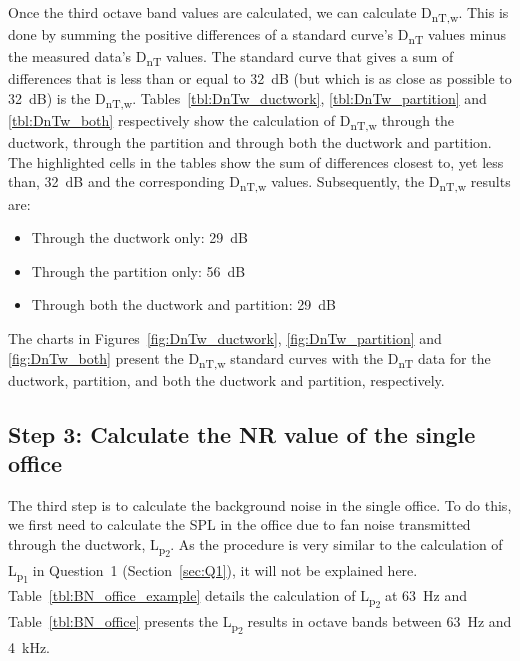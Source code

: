 Once the third octave band values are calculated, we can calculate D\textsubscript{nT,w}.
This is done by summing the positive differences of a standard curve's D\textsubscript{nT} values minus the measured data's D\textsubscript{nT} values.
The standard curve that gives a sum of differences that is less than or equal to 32~dB (but which is as close as possible to 32~dB) is the D\textsubscript{nT,w}.
Tables~\ref{tbl:DnTw_ductwork}, \ref{tbl:DnTw_partition} and \ref{tbl:DnTw_both} respectively show the calculation of D\textsubscript{nT,w} through the ductwork, through the partition and through both the ductwork and partition.
The highlighted cells in the tables show the sum of differences closest to, yet less than, 32~dB and the corresponding D\textsubscript{nT,w} values.
Subsequently, the D\textsubscript{nT,w} results are:
\begin{itemize}
	\item Through the ductwork only: 29~dB
	\item Through the partition only: 56~dB
	\item Through both the ductwork and partition: 29~dB
\end{itemize}

The charts in Figures~\ref{fig:DnTw_ductwork}, \ref{fig:DnTw_partition} and \ref{fig:DnTw_both} present the D\textsubscript{nT,w} standard curves with the D\textsubscript{nT} data for the ductwork, partition, and both the ductwork and partition, respectively.


	














\subsection{Step 3: Calculate the NR value of the single office} \label{sec:Q4.3}

The third step is to calculate the background noise in the single office.
To do this, we first need to calculate the SPL in the office due to fan noise transmitted through the ductwork, L\textsubscript{p\textsubscript{2}}.
As the procedure is very similar to the calculation of L\textsubscript{p\textsubscript{1}} in Question~1 (Section~\ref{sec:Q1}), it will not be explained here.
Table~\ref{tbl:BN_office_example} details the calculation of L\textsubscript{p\textsubscript{2}} at 63~Hz and Table~\ref{tbl:BN_office} presents the L\textsubscript{p\textsubscript{2}} results in octave bands between 63~Hz and 4~kHz.


